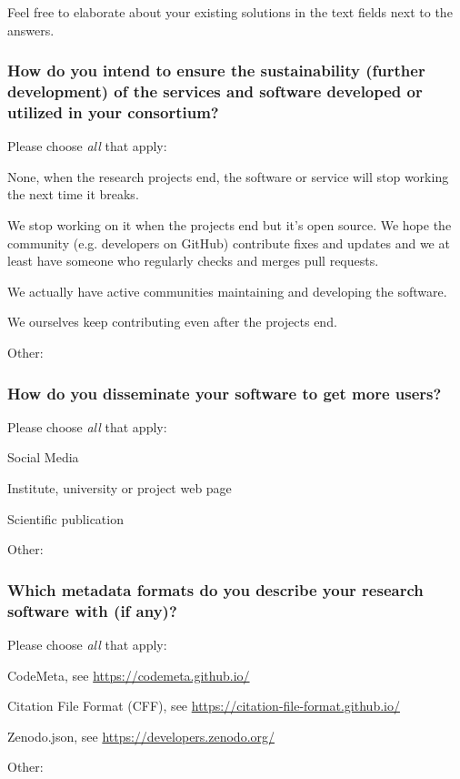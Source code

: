 \documentclass[headsepline,titlepage,twoside,12pt,toc=flat,headings=normal]{scrreprt}
\newcommand{\question}[1]{\subsubsection{#1}}
\newcommand{\otherbox}{\fbox{\phantom{This is how big an answer would be.}}}
\begin{document}
Feel free to elaborate about your existing solutions in the text fields
next to the answers.

\question{How do you intend to ensure the sustainability (further development) of the services and software developed or utilized in your consortium?}

Please choose \emph{all} that apply:

\begin{answers}
\item None, when the research projects end, the software or service will stop working the next time it breaks.
\item We stop working on it when the projects end but it's
  open source.
We hope the community (e.g. developers on GitHub)
  contribute fixes and updates and we at least have someone who
  regularly checks and merges pull requests.
\item We actually have active communities maintaining and developing the
  software.
\item We ourselves keep contributing even after the projects end.
\item Other: \otherbox
\end{answers}

\question{How do you disseminate your software to get more users?}\label{how-do-you-disseminate-your-software-to-get-more-users}
Please choose \emph{all} that apply:

\begin{answers}
\item Social Media
\item Institute, university or project web page
\item Scientific publication
\item Other: \otherbox
\end{answers}

\question{Which metadata formats do you describe your research software with (if any)?}\label{which-metadata-formats-do-you-describe-your-research-software-with-if-any}
Please choose \emph{all} that apply:

\begin{answers}
\item CodeMeta, see \url{https://codemeta.github.io/}
\item Citation File Format (CFF), see \url{https://citation-file-format.github.io/}
\item Zenodo.json, see \url{https://developers.zenodo.org/}
\item Other: \otherbox
\end{answers}
\end{document}

